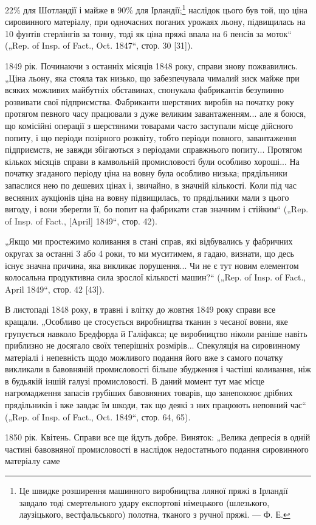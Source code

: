 22\% для Шотландії і майже в 90\% для Ірландії;\footnote{
Це швидке розширення машинного виробництва лляної пряжі в Ірландії
завдало тоді смертельного удару експортові німецького (шлезького, лаузіцького,
вестфальського) полотна, тканого з ручної пряжі. — Ф. Е.
} наслідок цього
був той, що ціна сировинного матеріалу, при одночасних поганих
урожаях льону, підвищилась на 10 фунтів стерлінгів за
тонну, тоді як ціна пряжі впала на 6 пенсів за моток“ („Rep.
of Insp. of Fact., Oct. 1847“, стор. 30 [31]).

1849 рік. Починаючи з останніх місяців 1848 року, справи
знову пожвавились. „Ціна льону, яка стояла так низько, що забезпечувала
чималий зиск майже при всяких можливих майбутніх
обставинах, спонукала фабрикантів безупинно розвивати свої
підприємства. Фабриканти шерстяних виробів на початку року
протягом певного часу працювали з дуже великим завантаженням...
але я боюся, що комісійні операції з шерстяними товарами
часто заступали місце дійсного попиту, і що періоди позірного
розквіту, тобто періоди повного, завантаження підприємств, не
завжди збігаються з періодами справжнього попиту... Протягом
кількох місяців справи в камвольній промисловості були особливо
хороші... На початку згаданого періоду ціна на вовну була особливо
низька; прядільники запаслися нею по дешевих цінах
і, звичайно, в значній кількості. Коли під час весняних аукціонів
ціна на вовну підвищилась, то прядільники мали з цього вигоду,
і вони зберегли її, бо попит на фабрикати став значним і стійким“
(„Rep. of Insp. of Fact., [April] 1849“, стор. 42).

„Якщо ми простежимо коливання в стані справ, які відбувались
у фабричних округах за останні 3 або 4 роки, то ми муситимем,
я гадаю, визнати, що десь існує значна причина, яка
викликає порушення... Чи не є тут новим елементом колосальна
продуктивна сила зрослої кількості машин?“ („Rep. of Insp.
of Fact., April 1849“, стор. 42 [43]).

В листопаді 1848 року, в травні і влітку до жовтня 1849 року
справи все кращали. „Особливо це стосується виробництва
тканин з чесаної вовни, яке групується навколо Бредфорда
й Галіфакса; це виробництво ніколи раніше навіть приблизно
не досягало своїх теперішніх розмірів... Спекуляція на сировинному
матеріалі і непевність щодо можливого подання його
вже з самого початку викликали в бавовняній промисловості
більше збудження і частіші коливання, ніж в будьякій іншій
галузі промисловості. В даний момент тут має місце нагромадження
запасів грубіших бавовняних товарів, що занепокоює
дрібних прядільників і вже завдає їм шкоди, так що деякі з
них працюють неповний час“ („Rep. of Insp. of Fact., Oct. 1849“,
стор. 64, 65).

1850 рік. Квітень. Справи все ще йдуть добре. Виняток:
„Велика депресія в одній частині бавовняної промисловості
в наслідок недостатнього подання сировинного матеріалу саме